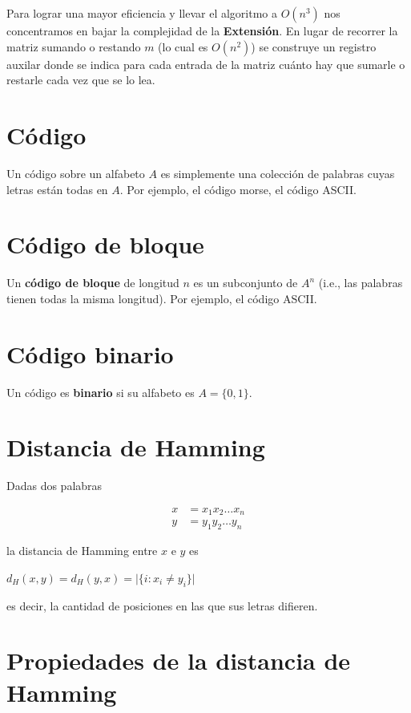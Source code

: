 \documentclass[10pt,a4paper]{article}
\begin{document}
Para lograr una mayor eficiencia y llevar el algoritmo a $O(n^3)$ nos concentramos en bajar la complejidad de la \textbf{Extensión}. En lugar de recorrer la matriz sumando o restando $m$ (lo cual es $O(n^2)$) se construye un registro auxilar donde se indica para cada entrada de la matriz cuánto hay que sumarle o restarle cada vez que se lo lea.

\section*{Código}

Un código sobre un alfabeto $A$ es simplemente una colección de palabras cuyas letras están todas en $A$. Por ejemplo, el código morse, el código ASCII.

\section*{Código de bloque}

Un \textbf{código de bloque} de longitud $n$ es un subconjunto de $A^n$ (i.e., las palabras tienen todas la misma longitud). Por ejemplo, el código ASCII.

\section*{Código binario}

Un código es \textbf{binario} si su alfabeto es $A = \{0, 1\}$.

\section*{Distancia de Hamming}

Dadas dos palabras

\begin{center}
\begin{align*}
x &= x_1x_2\dots x_n\\
y &= y_1y_2\dots y_n
\end{align*}
\end{center}

la distancia de Hamming entre $x$ e $y$ es

\begin{center}
$d_H(x, y) = d_H(y, x) = \lvert \{i: x_i \neq y_i\}\rvert$
\end{center}

es decir, la cantidad de posiciones en las que sus letras difieren.

\section*{Propiedades de la distancia de Hamming}
\end{document}
